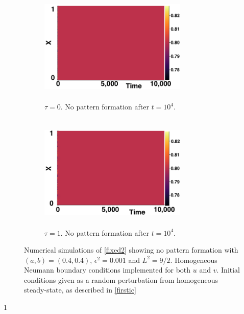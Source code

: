 \begin{figure}[H]
    \centering
    \begin{subfigure}[b]{0.45\textwidth}
        \centering
        \includegraphics[width=7cm,height = 5.5cm]{nopatt1.png}
        \caption{$\tau=0$. No pattern formation after $t=10^4$. }
        \label{}
    \end{subfigure}
    \hfill
    \begin{subfigure}[b]{0.45\textwidth}
        \centering
        \includegraphics[width=7cm,height = 5.5cm]{nopatt2.png}
        \caption{$\tau=1.$ No pattern formation after $t=10^4$.}
        \label{}
    \end{subfigure}
    \caption{Numerical simulations of \eqref{fixed2} showing no pattern formation with $(a,b)=(0.4,0.4)$, $\epsilon^2=0.001$ and $L^2=9/2$. Homogeneous Neumann boundary conditions implemented for both $u$ and $v$. Initial conditions given as a random perturbation from homogeneous steady-state, as described in \eqref{firstic}}
    \label{fig:fixedsim1}
\end{figure}1

